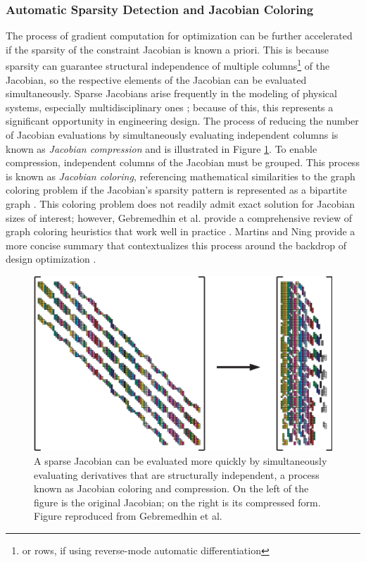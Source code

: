 \subsubsection{Automatic Sparsity Detection and Jacobian Coloring}

The process of gradient computation for optimization can be further accelerated if the sparsity of the constraint Jacobian is known a priori. This is because sparsity can guarantee structural independence of multiple columns\footnote{or rows, if using reverse-mode automatic differentiation} of the Jacobian, so the respective elements of the Jacobian can be evaluated simultaneously. Sparse Jacobians arise frequently in the modeling of physical systems, especially multidisciplinary ones \cite{lambe_extensions_2012}; because of this, this represents a significant opportunity in engineering design. The process of reducing the number of Jacobian evaluations by simultaneously evaluating independent columns is known as \textit{Jacobian compression} and is illustrated in Figure \ref{fig:jacobian_coloring}. To enable compression, independent columns of the Jacobian must be grouped. This process is known as \textit{Jacobian coloring}, referencing mathematical similarities to the graph coloring problem if the Jacobian's sparsity pattern is represented as a bipartite graph \cite{gebremedhin_efficient_2009}. This coloring problem does not readily admit exact solution for Jacobian sizes of interest; however, Gebremedhin et al. provide a comprehensive review of graph coloring heuristics that work well in practice \cite{gebremedhin_what_2005}. Martins and Ning provide a more concise summary that contextualizes this process around the backdrop of design optimization \cite{martins_engineering_2021}.

\begin{figure}[H]
    \centering
    \includegraphics[width=\textwidth]{../figures/gebremedhin_2005_figure}
    \caption{A sparse Jacobian can be evaluated more quickly by simultaneously evaluating derivatives that are structurally independent, a process known as Jacobian coloring and compression. On the left of the figure is the original Jacobian; on the right is its compressed form. Figure reproduced from Gebremedhin et al. \cite{gebremedhin_what_2005}}
    \label{fig:jacobian_coloring}
\end{figure}

